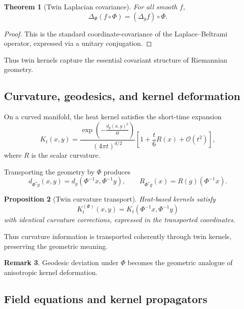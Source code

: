 \documentclass[11pt]{article}
\newtheorem{theorem}{Theorem}[section]
\newtheorem{proposition}[theorem]{Proposition}
\theoremstyle{definition}
\newtheorem{remark}[theorem]{Remark}
\begin{document}
\begin{theorem}[Twin Laplacian covariance]
	For all smooth $f$,
	\[
	\Delta_\Phi (f \circ \Phi) = (\Delta_g f)\circ \Phi.
	\]
\end{theorem}

\begin{proof}
	This is the standard coordinate-covariance of the Laplace–Beltrami operator, expressed via a unitary conjugation.
\end{proof}

Thus twin kernels capture the essential covariant structure of Riemannian geometry.

\subsection{Curvature, geodesics, and kernel deformation}

On a curved manifold, the heat kernel satisfies the short-time expansion
\[
K_t(x,y)
= \frac{\exp\!\left(-\frac{d_g(x,y)^2}{4t}\right)}{(4\pi t)^{d/2}}
\left[ 1 + \frac{t}{6} R(x) + \mathcal{O}(t^2)\right],
\]
where $R$ is the scalar curvature.

Transporting the geometry by $\Phi$ produces
\[
d_{\Phi^\ast g}(x,y)=d_g(\Phi^{-1}x,\Phi^{-1}y),
\qquad
R_{\Phi^\ast g}(x)=R(g)(\Phi^{-1}x).
\]

\begin{proposition}[Twin curvature transport]
	Heat-based kernels satisfy
	\[
	K_t^{(\Phi)}(x,y)
	=K_t(\Phi^{-1}x,\Phi^{-1}y)
	\]
	with identical curvature corrections, expressed in the transported coordinates.
\end{proposition}

Thus curvature information is transported coherently through twin kernels, preserving the geometric meaning.

\begin{remark}
	Geodesic deviation under $\Phi$ becomes the geometric analogue of anisotropic kernel deformation.
\end{remark}

\subsection{Field equations and kernel propagators}
\end{document}
